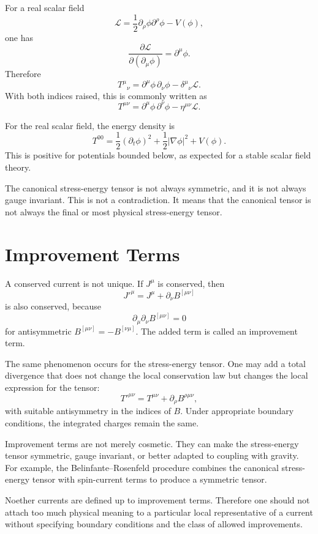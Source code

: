For a real scalar field
\[
    \mathcal{L}=\frac{1}{2}\partial_\rho\phi\partial^\rho\phi-V(\phi),
\]
one has
\[
    \frac{\partial\mathcal{L}}{\partial(\partial_\mu\phi)}=\partial^\mu\phi.
\]
Therefore
\[
    T^\mu{}_{\nu}=\partial^\mu\phi\,\partial_\nu\phi
    -\delta^\mu{}_{\nu}\mathcal{L}.
\]
With both indices raised, this is commonly written as
\[
    T^{\mu\nu}=\partial^\mu\phi\,\partial^\nu\phi-\eta^{\mu\nu}\mathcal{L}.
\]

\begin{examplebox}
For the real scalar field, the energy density is
\[
    T^{00}=\frac{1}{2}(\partial_t\phi)^2
    +\frac{1}{2}|\nabla\phi|^2+V(\phi).
\]
This is positive for potentials bounded below, as expected for a stable scalar
field theory.
\end{examplebox}

The canonical stress-energy tensor is not always symmetric, and it is not always
gauge invariant. This is not a contradiction. It means that the canonical tensor
is not always the final or most physical stress-energy tensor.

\section{Improvement Terms}

A conserved current is not unique. If \(J^\mu\) is conserved, then
\[
    J'^\mu=J^\mu+\partial_\nu B^{[\mu\nu]}
\]
is also conserved, because
\[
    \partial_\mu\partial_\nu B^{[\mu\nu]}=0
\]
for antisymmetric \(B^{[\mu\nu]}=-B^{[\nu\mu]}\). The added term is called an
improvement term.

The same phenomenon occurs for the stress-energy tensor. One may add a total
divergence that does not change the local conservation law but changes the
local expression for the tensor:
\[
    T'^{\mu\nu}=T^{\mu\nu}+\partial_\rho B^{\rho\mu\nu},
\]
with suitable antisymmetry in the indices of \(B\). Under appropriate boundary
conditions, the integrated charges remain the same.

Improvement terms are not merely cosmetic. They can make the stress-energy
tensor symmetric, gauge invariant, or better adapted to coupling with gravity.
For example, the Belinfante--Rosenfeld procedure combines the canonical
stress-energy tensor with spin-current terms to produce a symmetric tensor.

\begin{remarkbox}
Noether currents are defined up to improvement terms. Therefore one should not
attach too much physical meaning to a particular local representative of a
current without specifying boundary conditions and the class of allowed
improvements.
\end{remarkbox}

